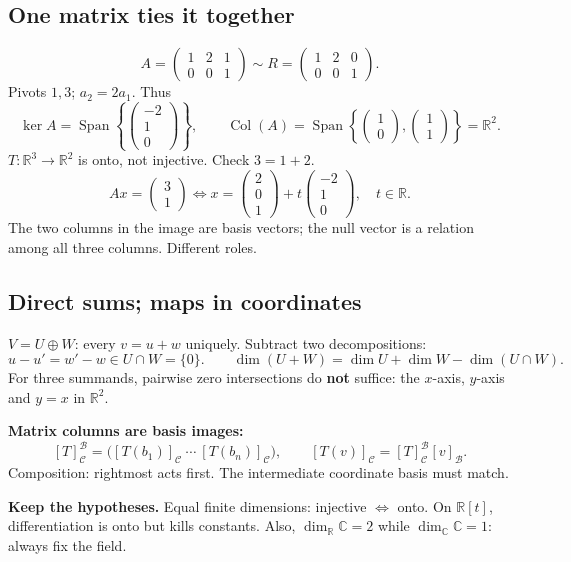 \documentclass[11pt,letterpaper]{article}
\begin{document}
\subsection{One matrix ties it
together}\label{one-matrix-ties-it-together}
\[
A=\begin{pmatrix}1&2&1\\0&0&1\end{pmatrix}
\sim R=\begin{pmatrix}1&2&0\\0&0&1\end{pmatrix}.
\] Pivots \(1,3\); \(a_2=2a_1\). Thus \[
\ker A=\operatorname{Span}\left\{\begin{pmatrix}-2\\1\\0\end{pmatrix}\right\},\qquad
\operatorname{Col}(A)=\operatorname{Span}\left\{\begin{pmatrix}1\\0\end{pmatrix},
\begin{pmatrix}1\\1\end{pmatrix}\right\}=\mathbb R^2.
\] \(T:\mathbb R^3\to\mathbb R^2\) is onto, not injective. Check
\(3=1+2\). \[
Ax=\begin{pmatrix}3\\1\end{pmatrix}
\iff x=\begin{pmatrix}2\\0\\1\end{pmatrix}
+t\begin{pmatrix}-2\\1\\0\end{pmatrix},\quad t\in\mathbb R.
\] The two columns in the image are basis vectors; the null vector is a
relation among all three columns. Different roles.

\subsection{Direct sums; maps in
coordinates}\label{direct-sums-maps-in-coordinates}

\(V=U\oplus W\): every \(v=u+w\) uniquely. Subtract two decompositions:
\[
u-u'=w'-w\in U\cap W=\{0\}.
\qquad \dim(U+W)=\dim U+\dim W-\dim(U\cap W).
\] For three summands, pairwise zero intersections do \textbf{not}
suffice: the \(x\)-axis, \(y\)-axis and \(y=x\) in \(\mathbb R^2\).

\textbf{Matrix columns are basis images:} \[
[T]^\mathcal B_\mathcal C
=\bigl([T(b_1)]_\mathcal C\ \cdots\ [T(b_n)]_\mathcal C\bigr),\qquad
[T(v)]_\mathcal C=[T]^\mathcal B_\mathcal C[v]_\mathcal B.
\] Composition: rightmost acts first. The intermediate coordinate basis
must match.

\textbf{Keep the hypotheses.} Equal finite dimensions: injective
\(\iff\) onto. On \(\mathbb R[t]\), differentiation is onto but kills
constants. Also, \(\dim_{\mathbb R}\mathbb C=2\) while
\(\dim_{\mathbb C}\mathbb C=1\): always fix the field.
\end{document}
